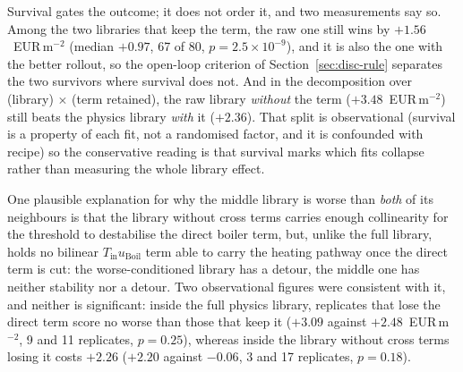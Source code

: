 Survival gates the outcome; it does not order it, and two measurements say so.
Among the two libraries that keep the term, the raw one still wins by
$+1.56$~EUR\,m$^{-2}$ (median $+0.97$, 67 of 80, $p=2.5\times10^{-9}$), and it is
also the one with the better rollout, so the open-loop criterion of
Section~\ref{sec:disc-rule} separates the two survivors where survival does not.
And in the decomposition over (library) $\times$ (term retained), the raw library
\emph{without} the term ($+3.48$~EUR\,m$^{-2}$) still beats the physics library
\emph{with} it ($+2.36$).
That split is observational (survival is a property of each fit, not a randomised factor, and it is confounded with recipe) so the conservative reading is that
survival marks which fits collapse rather than measuring the whole library effect.

One plausible explanation for why the middle library is worse than \emph{both} of its
neighbours is that the library without cross terms carries enough collinearity for
the threshold to destabilise the direct boiler term, but, unlike the full library, holds no bilinear $T_{\text{in}}u_{\text{Boil}}$ term able to carry the
heating pathway once the direct term is cut: the worse-conditioned library has a
detour, the middle one has neither stability nor a detour. Two
observational figures were consistent with it, and neither is significant: inside
the full physics library, replicates that lose the direct term score no worse than
those that keep it ($+3.09$ against $+2.48$~EUR\,m$^{-2}$, 9 and 11 replicates,
$p=0.25$), whereas inside the library without cross terms losing it costs
$+2.26$ ($+2.20$ against $-0.06$, 3 and 17 replicates, $p=0.18$).

